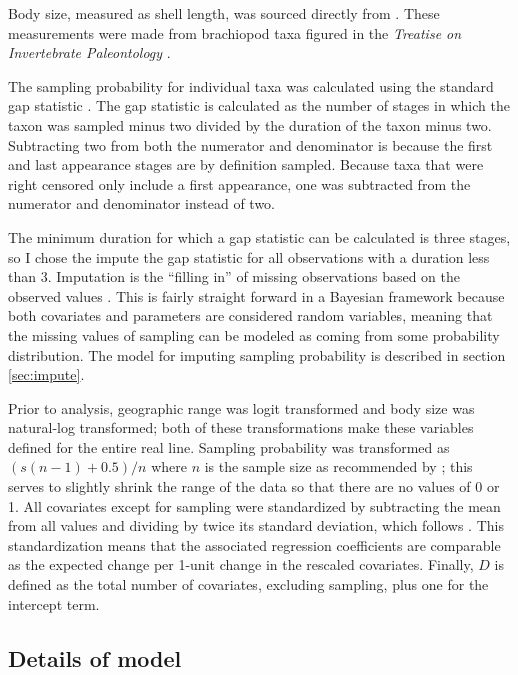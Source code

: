 \documentclass{article}
\begin{document}
Body size, measured as shell length, was sourced directly from \citet{Payne2014}. These measurements were made from brachiopod taxa figured in the \textit{Treatise on Invertebrate Paleontology} \citep{Brunton2007}.

The sampling probability for individual taxa was calculated using the standard gap statistic \citep{Foote1996e,Foote2000}. The gap statistic is calculated as the number of stages in which the taxon was sampled minus two divided by the duration of the taxon minus two. Subtracting two from both the numerator and denominator is because the first and last appearance stages are by definition sampled. Because taxa that were right censored only include a first appearance, one was subtracted from the numerator and denominator instead of two.

The minimum duration for which a gap statistic can be calculated is three stages, so I chose the impute the gap statistic for all observations with a duration less than 3. Imputation is the ``filling in'' of missing observations based on the observed values \citep{Rubin1996,Gelman2007}. This is fairly straight forward in a Bayesian framework because both covariates and parameters are considered random variables, meaning that the missing values of sampling can be modeled as coming from some probability distribution. The model for imputing sampling probability is described in section \ref{sec:impute}.

Prior to analysis, geographic range was logit transformed and body size was natural-log transformed; both of these transformations make these variables defined for the entire real line. Sampling probability was transformed as \((s (n - 1) + 0.5) / n\) where \(n\) is the sample size as recommended by \citet{Smithson2006}; this serves to slightly shrink the range of the data so that there are no values of 0 or 1. All covariates except for sampling were standardized by subtracting the mean from all values and dividing by twice its standard deviation, which follows \citet{Gelman2007}. This standardization means that the associated regression coefficients are comparable as the expected change per 1-unit change in the rescaled covariates. Finally, \(D\) is defined as the total number of covariates, excluding sampling, plus one for the intercept term.



\subsection{Details of model}
\label{sec:model}
\end{document}
